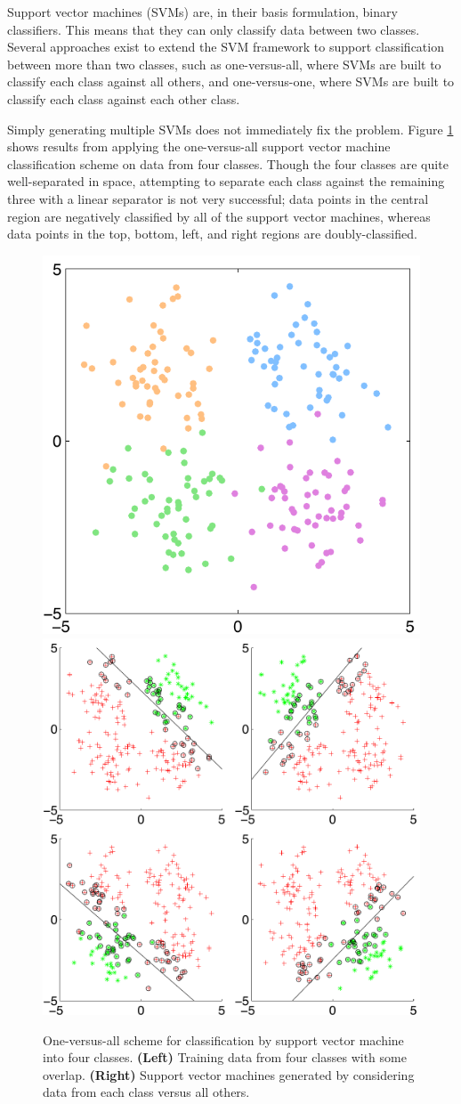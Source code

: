 \documentclass[12pt]{article}
\newcommand{\figlabel}[1]{\textbf{(#1)}}
\begin{document}
Support vector machines (SVMs) are, in their basis formulation, binary classifiers. This means that they can only classify data between two classes. Several approaches exist to extend the SVM framework to support classification between more than two classes, such as one-versus-all, where SVMs are built to classify each class against all others, and one-versus-one, where SVMs are built to classify each class against each other class.

Simply generating multiple SVMs does not immediately fix the problem. Figure \ref{fig:svm_training} shows results from applying the one-versus-all support vector machine classification scheme on data from four classes. Though the four classes are quite well-separated in space, attempting to separate each class against the remaining three with a linear separator is not very successful; data points in the central region are negatively classified by all of the support vector machines, whereas data points in the top, bottom, left, and right regions are doubly-classified.
\begin{figure}[H]
\centering
\includegraphics[width=.48\textwidth]{figures/svm_trainingdata}
\includegraphics[width=.48\textwidth]{figures/svm_multiplesvms}
\caption{One-versus-all scheme for classification by support vector machine into four classes. \figlabel{Left} Training data from four classes with some overlap. \figlabel{Right} Support vector machines generated by considering data from each class versus all others.}
\label{fig:svm_training}
\end{figure}
\end{document}

